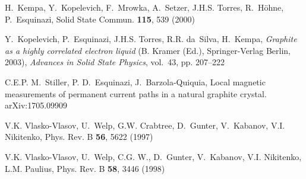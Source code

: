 \documentclass[aps,dvipsnames,twocolumn,floatfix,amsmath]{revtex4-1}
\begin{document}
\begin{thebibliography}{10}
H.~Kempa, Y.~Kopelevich, F.~Mrowka, A.~Setzer, J.H.S. Torres,
R.~H\"ohne,
  P.~Esquinazi, Solid State Commun. \textbf{115}, 539 (2000)

Y.~Kopelevich, P.~Esquinazi, J.H.S. Torres, R.R. da~Silva,
H.~Kempa,
  \emph{Graphite as a highly correlated electron liquid} ({\rm B. Kramer
  (Ed.)}, Springer-Verlag Berlin, 2003), \emph{Advances in Solid State
  Physics}, vol.~43, pp. 207--222

C.E.P. M.~Stiller, P. D.~Esquinazi, J.~Barzola-Quiquia, Local
magnetic
  measurements of permanent current paths in a natural graphite crystal.
\newblock \rm arXiv:1705.09909

V.K. Vlasko-Vlasov, U.~Welp, G.W. Crabtree, D.~Gunter, V.~Kabanov,
V.I.
  Nikitenko, Phys. Rev. B \textbf{56}, 5622 (1997)

V.K. Vlasko-Vlasov, U.~Welp, C.G. W., D.~Gunter, V.~Kabanov, V.I.
Nikitenko,
  L.M. Paulius, Phys. Rev. B \textbf{58}, 3446 (1998)

\end{thebibliography}
\end{document}
